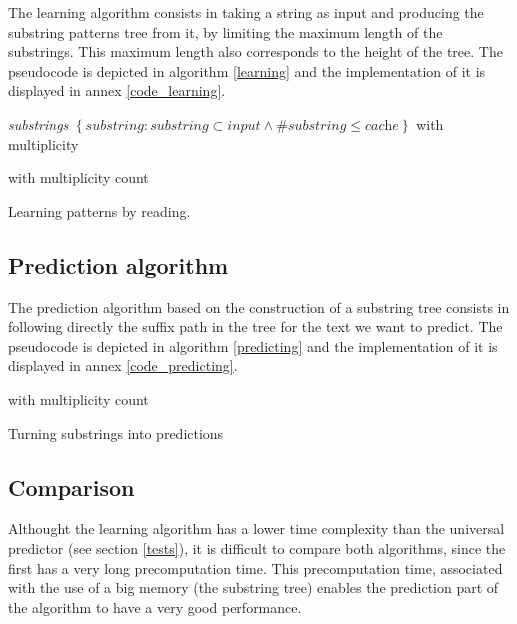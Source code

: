 \documentclass[a4paper,12pt]{article}
\begin{document}
  The learning algorithm consists in taking a string as input and producing the substring patterns tree from it, by limiting the maximum length of the substrings. This maximum length also corresponds to the height of the tree. The pseudocode is depicted in algorithm \ref{learning} and the implementation of it is displayed in annex \ref{code_learning}.

  \begin{algorithm}

    \textit{substrings} \gets{}
      $\left\{ \textit{substring} : \textit{substring}\subset\textit{input}
      \wedge \#\textit{substring} \leq \textit{cache} \right\}$
      with multiplicity\;

     with multiplicity count\;

    \caption{\label{learning}Learning patterns by reading.}
  \end{algorithm}

  \subsection{Prediction algorithm}

  The prediction algorithm based on the construction of a substring tree consists in following directly the suffix path in the tree for the text we want to predict. The pseudocode is depicted in algorithm \ref{predicting} and the implementation of it is displayed in annex \ref{code_predicting}.

  \begin{algorithm}

     with multiplicity count\;

    \caption{\label{predicting}Turning substrings into predictions}
  \end{algorithm}

  \subsection{Comparison}

  Althought the learning algorithm has a lower time complexity than the universal predictor (see section \ref{tests}), it is difficult to compare both algorithms, since the first has a very long precomputation time. This precomputation time, associated with the use of a big memory (the substring tree) enables the prediction part of the algorithm to have a very good performance.
\end{document}
